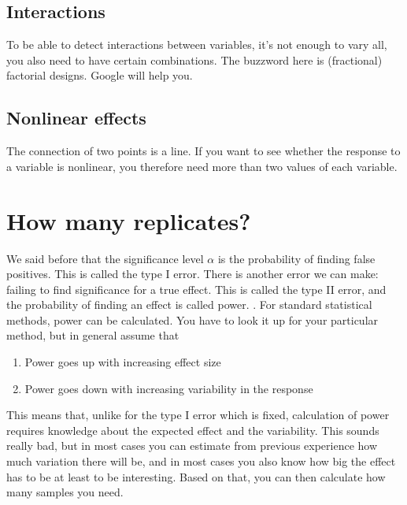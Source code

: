 \documentclass[a4paper,twoside]{tufte-book}\usepackage[]{graphicx}\usepackage[]{color}
\begin{document}
\subsection{Interactions}

To be able to detect interactions between variables, it's not enough to vary all, you also need to have certain combinations. The buzzword here is (fractional) factorial designs. Google will help you.

\subsection{Nonlinear effects}

The connection of two points is a line. If you want to see whether the response to a variable is nonlinear, you therefore need more than two values of each variable.  


\section{How many replicates?}

We said before that the significance level $\alpha$ is the probability of finding false positives. This is called the type I error. There is another error we can make: failing to find significance for a true effect. This is called the type II error, and the probability of finding an effect is called power. . For standard statistical methods, power can be calculated. You have to look it up for your particular method, but in general assume that 

\begin{enumerate}
\item Power goes up with increasing effect size
\item Power goes down with increasing variability in the response
\end{enumerate}

This means that, unlike for the type I error which is fixed, calculation of power requires knowledge about the expected effect and the variability. This sounds really bad, but in most cases you can estimate from previous experience how much variation there will be, and in most cases you also know how big the effect has to be at least to be interesting. Based on that, you can then calculate how many samples you need.
\end{document}
